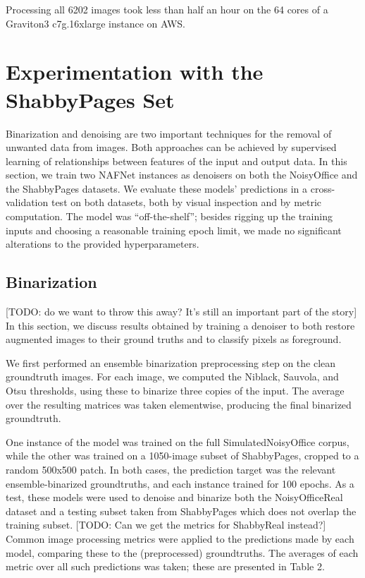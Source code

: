 \documentclass[runningheads]{llncs}
\begin{document}
Processing all 6202 images took less than half an hour on the 64 cores of a Graviton3 c7g.16xlarge instance on AWS.

\section{Experimentation with the ShabbyPages Set}
Binarization and denoising are two important techniques for the removal of unwanted data from images.
Both approaches can be achieved by supervised learning of relationships between features of the input and output data.
In this section, we train two NAFNet \cite{ref_nafnet} instances as denoisers on both the NoisyOffice and the ShabbyPages datasets. We evaluate these models' predictions in a cross-validation test on both datasets, both by visual inspection and by metric computation.
The model was ``off-the-shelf''; besides rigging up the training inputs and choosing a reasonable training epoch limit, we made no significant alterations to the provided hyperparameters.

\subsection{Binarization} [TODO: do we want to throw this away? It's still an important part of the story]
In this section, we discuss results obtained by training a denoiser to both restore augmented images to their ground truths and to classify pixels as foreground.

We first performed an ensemble binarization preprocessing step on the clean groundtruth images.
For each image, we computed the Niblack, Sauvola, and Otsu thresholds, using these to binarize three copies of the input. The average over the resulting matrices was taken elementwise, producing the final binarized groundtruth.

One instance of the model was trained on the full SimulatedNoisyOffice corpus, while the other was trained on a 1050-image subset of ShabbyPages, cropped to a random 500x500 patch. In both cases, the prediction target was the relevant ensemble-binarized groundtruths, and each instance trained for 100 epochs.
As a test, these models were used to denoise and binarize both the NoisyOfficeReal dataset and a testing subset taken from ShabbyPages which does not overlap the training subset. [TODO: Can we get the metrics for ShabbyReal instead?]
Common image processing metrics were applied to the predictions made by each model, comparing these to the (preprocessed) groundtruths.
The averages of each metric over all such predictions was taken; these are presented in Table 2.
\end{document}
